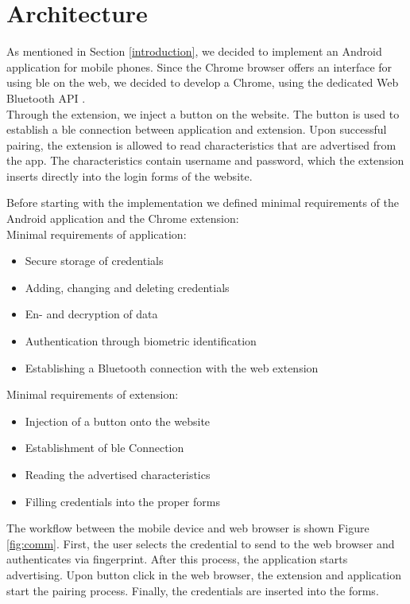 \section{Architecture} \label{architecture}
As mentioned in Section \ref{introduction}, we decided to implement an Android application for mobile phones. Since the Chrome browser offers an interface for using \gls{ble} on the web, we decided to develop a Chrome, using the dedicated Web Bluetooth API \cite{WebBTAPI}. \\
Through the extension, we inject a button on the website. The button is used to establish a \gls{ble} connection between application and extension. Upon successful pairing, the extension is allowed to read characteristics that are advertised from the app. The characteristics contain username and password, which the extension inserts directly into the login forms of the website.

\noindent Before starting with the implementation we defined minimal requirements of the Android application and the Chrome extension: \\

\noindent Minimal requirements of application:
\begin{itemize}
\item Secure storage of credentials
\item Adding, changing and deleting credentials
\item En- and decryption of data 
\item Authentication through biometric identification
\item Establishing a Bluetooth connection with the web extension
\end{itemize}
\vspace{0.3cm}
\noindent Minimal requirements of extension:
\begin{itemize}
\item Injection of a button onto the website
\item Establishment of \gls{ble} Connection
\item Reading the advertised characteristics
\item Filling credentials into the proper forms
\end{itemize}

The workflow between the mobile device and web browser is shown Figure \ref{fig:comm}. First, the user selects the credential to send to the web browser and authenticates via fingerprint. After this process, the application starts advertising. Upon button click in the web browser, the extension and application start the pairing process. Finally, the credentials are inserted into the forms. \\


